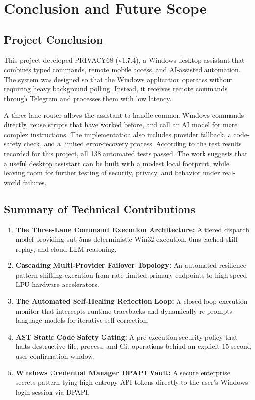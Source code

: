 \documentclass[12pt,letterpaper,oneside]{report}
\begin{document}
\chapter{Conclusion and Future Scope}
\section{Project Conclusion}
This project developed PRIVACY68 (v1.7.4), a Windows desktop assistant that combines typed commands, remote mobile access, and AI-assisted automation. The system was designed so that the Windows application operates without requiring heavy background polling. Instead, it receives remote commands through Telegram and processes them with low latency.

A three-lane router allows the assistant to handle common Windows commands directly, reuse scripts that have worked before, and call an AI model for more complex instructions. The implementation also includes provider fallback, a code-safety check, and a limited error-recovery process. According to the test results recorded for this project, all 138 automated tests passed. The work suggests that a useful desktop assistant can be built with a modest local footprint, while leaving room for further testing of security, privacy, and behavior under real-world failures.

\section{Summary of Technical Contributions}
\begin{enumerate}
    \item \textbf{The Three-Lane Command Execution Architecture:} A tiered dispatch model providing sub-5ms deterministic Win32 execution, 0ms cached skill replay, and cloud LLM reasoning.
    \item \textbf{Cascading Multi-Provider Failover Topology:} An automated resilience pattern shifting execution from rate-limited primary endpoints to high-speed LPU hardware accelerators.
    \item \textbf{The Automated Self-Healing Reflection Loop:} A closed-loop execution monitor that intercepts runtime tracebacks and dynamically re-prompts language models for iterative self-correction.
    \item \textbf{AST Static Code Safety Gating:} A pre-execution security policy that halts destructive file, process, and Git operations behind an explicit 15-second user confirmation window.
    \item \textbf{Windows Credential Manager DPAPI Vault:} A secure enterprise secrets pattern tying high-entropy API tokens directly to the user's Windows login session via DPAPI.
\end{enumerate}
\end{document}
